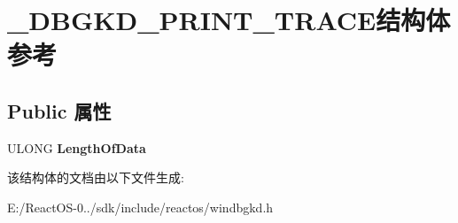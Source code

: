 \hypertarget{struct___d_b_g_k_d___p_r_i_n_t___t_r_a_c_e}{}\section{\+\_\+\+D\+B\+G\+K\+D\+\_\+\+P\+R\+I\+N\+T\+\_\+\+T\+R\+A\+C\+E结构体 参考}
\label{struct___d_b_g_k_d___p_r_i_n_t___t_r_a_c_e}
\subsection*{Public 属性}
\begin{DoxyCompactItemize}
\item 
\mbox{\label{struct___d_b_g_k_d___p_r_i_n_t___t_r_a_c_e_a72afdae7167ffc453ec1086ceb36467d}} 
U\+L\+O\+NG {\bfseries Length\+Of\+Data}
\end{DoxyCompactItemize}


该结构体的文档由以下文件生成\+:\begin{DoxyCompactItemize}
\item 
E\+:/\+React\+O\+S-\/0../sdk/include/reactos/windbgkd.\+h\end{DoxyCompactItemize}
